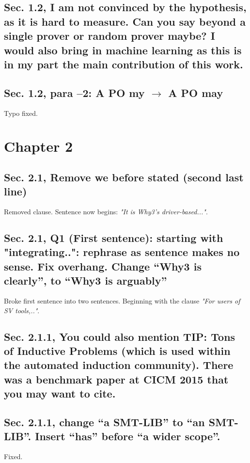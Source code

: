 \documentclass[]{article}
\begin{document}
\subsection{Sec. 1.2, I am not convinced by the hypothesis, as it is hard to measure. Can you say beyond a single prover or random prover maybe? I would also bring in machine learning as this is in my part the main contribution of this work.}

\subsection{Sec. 1.2, para –2: A PO my $\rightarrow$ A PO may}

Typo fixed.

\section{Chapter 2}

\subsection{Sec. 2.1, Remove we before stated (second last line)}

Removed clause. Sentence now begins: \emph{"It is \textsf{Why3}'s driver-based..."}.

\subsection{Sec. 2.1, Q1 (First sentence): starting with "integrating..": rephrase as sentence makes no sense. Fix overhang. Change “Why3 is clearly”, to “Why3 is arguably”}

Broke first sentence into two sentences. Beginning with the clause \emph{"For users of SV tools,.."}.

\subsection{Sec. 2.1.1, You could also mention TIP: Tons of Inductive Problems (which is used within the automated induction community). There was a benchmark paper at CICM 2015 that you may want to cite.}

\subsection{Sec. 2.1.1, change “a SMT-LIB” to “an SMT-LIB”. Insert “has” before “a wider scope”.}

Fixed.
\end{document}
